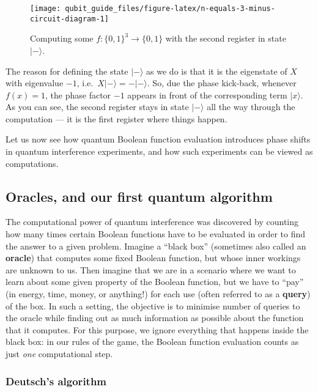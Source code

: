 \documentclass[fleqn]{article}
\begin{document}
\begin{figure}[H]

{\centering \texttt{[image: qubit\_guide\_files/figure-latex/n-equals-3-minus-circuit-diagram-1]} 

}

\caption{Computing some \(f\colon\{0,1\}^3\to\{0,1\}\) with the second register in state \(|-\rangle\).}\label{fig:n-equals-3-minus-circuit-diagram}
\end{figure}

The reason for defining the state \(|-\rangle\) as we do is that it is the eigenstate of \(X\) with eigenvalue \(-1\), i.e.~\(X|-\rangle=-|-\rangle\).
So, due the phase kick-back, whenever \(f(x)=1\), the phase factor \(-1\) appears in front of the corresponding term \(|x\rangle\).
As you can see, the second register stays in state \(|-\rangle\) all the way through the computation --- it is the first register where things happen.

Let us now see how quantum Boolean function evaluation introduces phase shifts in quantum interference experiments, and how such experiments can be viewed as computations.

\hypertarget{oracles-and-our-first-quantum-algorithm}{%
\subsection{Oracles, and our first quantum algorithm}\label{oracles-and-our-first-quantum-algorithm}}

The computational power of quantum interference was discovered by counting how many times certain Boolean functions have to be evaluated in order to find the answer to a given problem.
Imagine a ``black box'' (sometimes also called an \textbf{oracle}) that computes some fixed Boolean function, but whose inner workings are unknown to us.
Then imagine that we are in a scenario where we want to learn about some given property of the Boolean function, but we have to ``pay'' (in energy, time, money, or anything!) for each use (often referred to as a \textbf{query}) of the box.
In such a setting, the objective is to minimise number of queries to the oracle while finding out as much information as possible about the function that it computes.
For this purpose, we ignore everything that happens inside the black box: in our rules of the game, the Boolean function evaluation counts as just \emph{one} computational step.

\hypertarget{deutschs-algorithm}{%
\subsubsection{Deutsch's algorithm}\label{deutschs-algorithm}}
\end{document}
